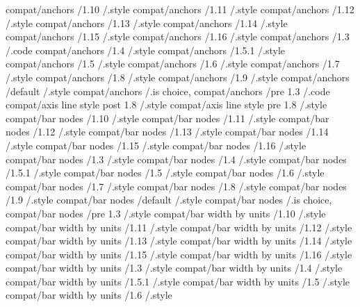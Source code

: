 compat/anchors                 /1.10        /.style
compat/anchors                 /1.11        /.style
compat/anchors                 /1.12        /.style
compat/anchors                 /1.13        /.style
compat/anchors                 /1.14        /.style
compat/anchors                 /1.15        /.style
compat/anchors                 /1.16        /.style
compat/anchors                 /1.3         /.code
compat/anchors                 /1.4         /.style
compat/anchors                 /1.5.1       /.style
compat/anchors                 /1.5         /.style
compat/anchors                 /1.6         /.style
compat/anchors                 /1.7         /.style
compat/anchors                 /1.8         /.style
compat/anchors                 /1.9         /.style
compat/anchors                 /default     /.style
compat/anchors                              /.is choice, 
compat/anchors                 /pre 1.3     /.code
compat/axis line style post 1.8             /.style      
compat/axis line style pre 1.8              /.style      
compat/bar nodes               /1.10        /.style
compat/bar nodes               /1.11        /.style
compat/bar nodes               /1.12        /.style
compat/bar nodes               /1.13        /.style
compat/bar nodes               /1.14        /.style
compat/bar nodes               /1.15        /.style
compat/bar nodes               /1.16        /.style
compat/bar nodes               /1.3         /.style
compat/bar nodes               /1.4         /.style
compat/bar nodes               /1.5.1       /.style
compat/bar nodes               /1.5         /.style
compat/bar nodes               /1.6         /.style
compat/bar nodes               /1.7         /.style
compat/bar nodes               /1.8         /.style
compat/bar nodes               /1.9         /.style
compat/bar nodes               /default     /.style
compat/bar nodes                            /.is choice, 
compat/bar nodes               /pre 1.3     /.style
compat/bar width by units      /1.10        /.style
compat/bar width by units      /1.11        /.style
compat/bar width by units      /1.12        /.style
compat/bar width by units      /1.13        /.style
compat/bar width by units      /1.14        /.style
compat/bar width by units      /1.15        /.style
compat/bar width by units      /1.16        /.style
compat/bar width by units      /1.3         /.style
compat/bar width by units      /1.4         /.style
compat/bar width by units      /1.5.1       /.style
compat/bar width by units      /1.5         /.style
compat/bar width by units      /1.6         /.style

